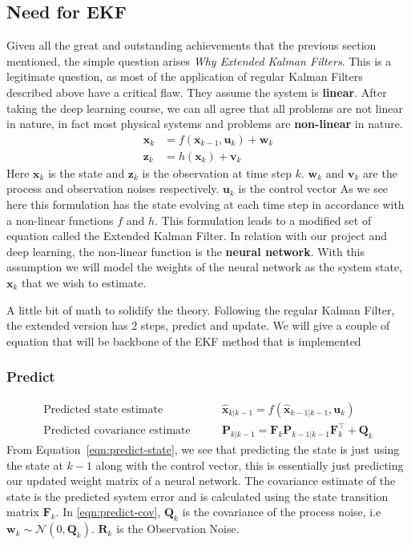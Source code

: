 \documentclass{article}
\begin{document}
\subsection{Need for EKF}
Given all the great and outstanding achievements that the previous section mentioned, the simple question arises \textit{Why Extended Kalman Filters}. This is a legitimate question, as most of the application of regular Kalman Filters described above have a critical flaw. They assume the system is \textbf{linear}. After taking the deep learning course, we can all agree that all problems are not linear in nature, in fact most physical systems and problems are \textbf{non-linear} in nature. 
\begin{equation}
\label{eqn:ekf}
\begin{aligned} \boldsymbol{x}_{k} &=f\left(\boldsymbol{x}_{k-1}, \boldsymbol{u}_{k}\right)+\boldsymbol{w}_{k} \\ \boldsymbol{z}_{k} &=h\left(\boldsymbol{x}_{k}\right)+\boldsymbol{v}_{k} \end{aligned}
\end{equation}
Here $\boldsymbol{x}_k$ is the state and $\boldsymbol{z}_k$ is the observation at time step $k$. $\boldsymbol{w}_k$ and $\boldsymbol{v}_k$ are the process and observation noises respectively. $\boldsymbol{u}_k$ is the control vector As we see here this formulation has the state evolving at each time step in accordance with a non-linear functions $f$ and $h$. This formulation leads to a modified set of equation called the Extended Kalman Filter. In relation with our project and deep learning, the non-linear function is the \textbf{neural network}. With this assumption we will model the weights of the neural network as the system state, $\boldsymbol{x}_k$ that we wish to estimate. 

A little bit of math to solidify the theory. Following the regular Kalman Filter, the extended version has 2 steps, predict and update. We will give a couple of equation that will be backbone of the EKF method that is implemented 

\subsubsection{Predict}
\begin{align}
    \textrm{Predicted state estimate}\qquad &\hat{\boldsymbol{x}}_{k | k-1}=f\left(\hat{\boldsymbol{x}}_{k-1 | k-1}, \boldsymbol{u}_{k}\right) \label{eqn:predict-state} \\	
    \textrm{Predicted covariance estimate} \qquad & \boldsymbol{P}_{k | k-1}=\boldsymbol{F}_{k} \boldsymbol{P}_{k-1 | k-1} \boldsymbol{F}_{k}^{\top}+\boldsymbol{Q}_{k} \label{eqn:predict-cov}
\end{align}
From Equation~\eqref{eqn:predict-state}, we see that predicting the state is just using the state at $k-1$ along with the control vector, this is essentially just predicting our updated weight matrix of a neural network. The covariance estimate of the state is the predicted system error and is calculated using the state transition matrix $\boldsymbol{F}_k$. In \eqref{eqn:predict-cov}, $\boldsymbol{Q}_k$ is the covariance of the process noise, i.e $\boldsymbol{w}_{k} \sim \mathcal{N}\left(0, \mathbf{Q}_{k}\right)$.
$\boldsymbol{R}_k$ is the Observation Noise.
\end{document}
